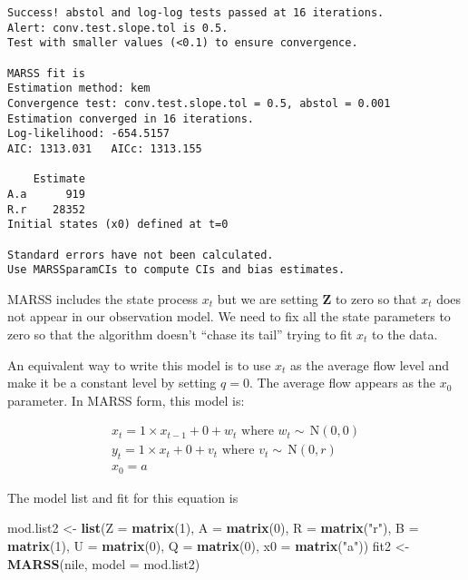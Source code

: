 \documentclass[12pt,]{book}
\newenvironment{Shaded}{\begin{snugshade}}{\end{snugshade}}
\newcommand{\DataTypeTok}[1]{\textcolor[rgb]{0.13,0.29,0.53}{#1}}
\newcommand{\DecValTok}[1]{\textcolor[rgb]{0.00,0.00,0.81}{#1}}
\newcommand{\KeywordTok}[1]{\textcolor[rgb]{0.13,0.29,0.53}{\textbf{#1}}}
\newcommand{\NormalTok}[1]{#1}
\newcommand{\StringTok}[1]{\textcolor[rgb]{0.31,0.60,0.02}{#1}}
\begin{document}
\begin{verbatim}
Success! abstol and log-log tests passed at 16 iterations.
Alert: conv.test.slope.tol is 0.5.
Test with smaller values (<0.1) to ensure convergence.

MARSS fit is
Estimation method: kem 
Convergence test: conv.test.slope.tol = 0.5, abstol = 0.001
Estimation converged in 16 iterations. 
Log-likelihood: -654.5157 
AIC: 1313.031   AICc: 1313.155   
 
    Estimate
A.a      919
R.r    28352
Initial states (x0) defined at t=0

Standard errors have not been calculated. 
Use MARSSparamCIs to compute CIs and bias estimates.
\end{verbatim}

MARSS includes the state process \(x_t\) but we are setting \(\mathbf{Z}\) to zero so that \(x_t\) does not appear in our observation model. We need to fix all the state parameters to zero so that the algorithm doesn't ``chase its tail'' trying to fit \(x_t\) to the data.

An equivalent way to write this model is to use \(x_t\) as the average flow level and make it be a constant level by setting \(q=0\). The average flow appears as the \(x_0\) parameter. In MARSS form, this model is:

\begin{equation}
\begin{gathered}
x_t = 1 \times x_{t-1}+ 0 + w_t    \text{ where } w_t \sim \,\text{N}(0,0) \\
y_t = 1 \times x_t + 0 + v_t \text{ where } v_t \sim \,\text{N}(0,r)  \\
x_0 = a 
 \end{gathered}   
\label{eq:short-flat-level-model2}
\end{equation}

The model list and fit for this equation is

\begin{Shaded}
\begin{Highlighting}[]
\NormalTok{mod.list2 <-}\StringTok{ }\KeywordTok{list}\NormalTok{(}\DataTypeTok{Z =} \KeywordTok{matrix}\NormalTok{(}\DecValTok{1}\NormalTok{), }\DataTypeTok{A =} \KeywordTok{matrix}\NormalTok{(}\DecValTok{0}\NormalTok{), }\DataTypeTok{R =} \KeywordTok{matrix}\NormalTok{(}\StringTok{"r"}\NormalTok{), }
    \DataTypeTok{B =} \KeywordTok{matrix}\NormalTok{(}\DecValTok{1}\NormalTok{), }\DataTypeTok{U =} \KeywordTok{matrix}\NormalTok{(}\DecValTok{0}\NormalTok{), }\DataTypeTok{Q =} \KeywordTok{matrix}\NormalTok{(}\DecValTok{0}\NormalTok{), }\DataTypeTok{x0 =} \KeywordTok{matrix}\NormalTok{(}\StringTok{"a"}\NormalTok{))}
\NormalTok{fit2 <-}\StringTok{ }\KeywordTok{MARSS}\NormalTok{(nile, }\DataTypeTok{model =}\NormalTok{ mod.list2)}
\end{Highlighting}
\end{Shaded}
\end{document}
